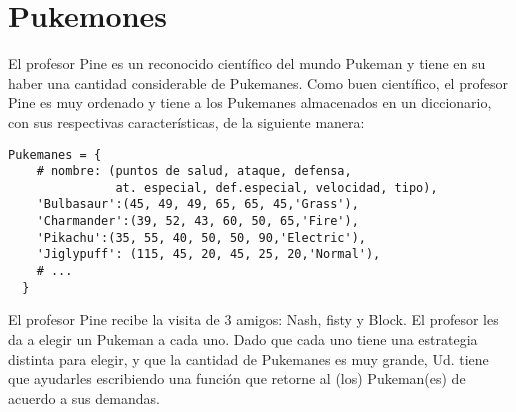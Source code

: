 \section{Pukemones}

  El profesor Pine es un reconocido científico
  del mundo Pukeman y tiene en su haber
  una cantidad considerable de Pukemanes.
  Como buen científico,
  el profesor Pine es muy ordenado
  y tiene a los Pukemanes almacenados
  en un diccionario,
  con sus respectivas características,
  de la siguiente manera:
  
  \begin{lstlisting}[style = consola]
  Pukemanes = {
    # nombre: (puntos de salud, ataque, defensa,
               at. especial, def.especial, velocidad, tipo),
    'Bulbasaur':(45, 49, 49, 65, 65, 45,'Grass'),
    'Charmander':(39, 52, 43, 60, 50, 65,'Fire'),
    'Pikachu':(35, 55, 40, 50, 50, 90,'Electric'),
    'Jiglypuff': (115, 45, 20, 45, 25, 20,'Normal'),
    # ...
  }
  \end{lstlisting}
  
  El profesor Pine recibe la visita de 3 amigos:
  Nash, fisty y Block.
  El profesor les da a elegir
  un Pukeman a cada uno.
  Dado que cada uno tiene una estrategia distinta
  para elegir,
  y que la cantidad de Pukemanes es muy grande,
  Ud. tiene que ayudarles escribiendo
  una función que retorne al
  (los) Pukeman(es) de acuerdo a sus demandas.
  
